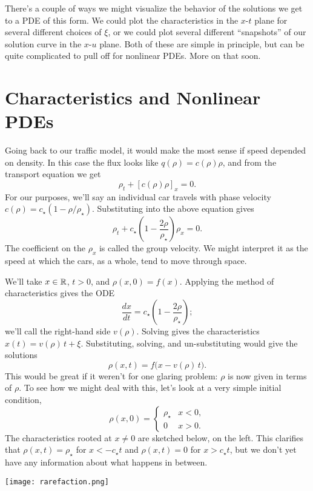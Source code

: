 \documentclass[../m180main.tex]{subfiles}
\begin{document}
There's a couple of ways we might visualize the behavior of the solutions we get to a PDE of this form.
We could plot the characteristics in the $x$-$t$ plane for several different choices of $\xi$, or we could plot several different ``snapshots'' of our solution curve in the $x$-$u$ plane.
Both of these are simple in principle, but can be quite complicated to pull off for nonlinear PDEs.
More on that soon.

\section{Characteristics and Nonlinear PDEs}
Going back to our traffic model, it would make the most sense if speed depended on density.
In this case the flux looks like $q(\rho) = c(\rho) \rho$, and from the transport equation we get
\[ \rho_t + [c(\rho) \rho]_x = 0. \]
For our purposes, we'll say an individual car travels with phase velocity $c(\rho) = c_\star (1 - \rho / \rho_\star)$.
Substituting into the above equation gives
\[ \rho_t + c_\star \left( 1 - \frac{2\rho}{\rho_\star} \right) \rho_x = 0. \]
The coefficient on the $\rho_x$ is called the group velocity.
We might interpret it as the speed at which the cars, as a whole, tend to move through space.

We'll take $x \in \mathbb{R}$, $t > 0$, and $\rho(x,0) = f(x)$.
Applying the method of characteristics gives the ODE
\[ \frac{dx}{dt} = c_\star \left( 1 - \frac{2\rho}{\rho_\star} \right); \]
we'll call the right-hand side $v(\rho)$.
Solving gives the characteristics $x(t) = v(\rho) \,t + \xi$.
Substituting, solving, and un-substituting would give the solutions
\[ \rho(x,t) = f \big( x - v(\rho) \,t \big). \]
This would be great if it weren't for one glaring problem: $\rho$ is now given in terms of $\rho$.
To see how we might deal with this, let's look at a very simple initial condition,
\[ \rho(x,0) = \begin{cases} \rho_\star & x < 0, \\ 0 & x > 0. \end{cases} \]
The characteristics rooted at $x \neq 0$ are sketched below, on the left.
This clarifies that $\rho(x,t) = \rho_\star$ for $x < -c_\star t$ and $\rho(x,t) = 0$ for $x > c_\star t$, but we don't yet have any information about what happens in between.

\begin{center}
    \texttt{[image: rarefaction.png]}
\end{center}
\end{document}
